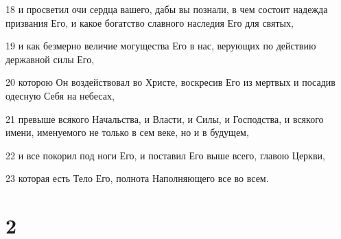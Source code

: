 \par 18 и просветил очи сердца вашего, дабы вы познали, в чем состоит надежда призвания Его, и какое богатство славного наследия Его для святых,
\par 19 и как безмерно величие могущества Его в нас, верующих по действию державной силы Его,
\par 20 которою Он воздействовал во Христе, воскресив Его из мертвых и посадив одесную Себя на небесах,
\par 21 превыше всякого Начальства, и Власти, и Силы, и Господства, и всякого имени, именуемого не только в сем веке, но и в будущем,
\par 22 и все покорил под ноги Его, и поставил Его выше всего, главою Церкви,
\par 23 которая есть Тело Его, полнота Наполняющего все во всем.

\chapter{2}

